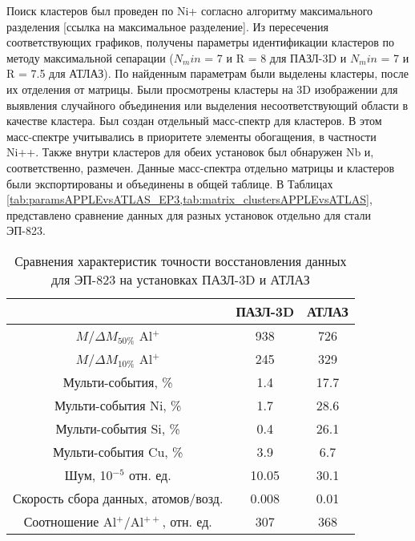 Поиск кластеров был проведен по Ni+ согласно алгоритму максимального разделения [ссылка на максимальное разделение]. Из пересечения соответствующих графиков, получены параметры идентификации кластеров по методу максимальной сепарации ($N_min$ = 7 и R = 8 для ПАЗЛ-3D и $N_min$ = 7 и R = 7.5 для АТЛАЗ). По найденным параметрам были выделены кластеры, после их отделения от матрицы. Были просмотрены кластеры на 3D изображении для выявления случайного объединения или выделения несоответствующий области в качестве кластера. Был создан отдельный масс-спектр для кластеров. В этом масс-спектре учитывались в приоритете элементы обогащения, в частности Ni++. Также внутри кластеров для обеих установок был обнаружен Nb и, соответственно, размечен. Данные масс-спектра отдельно матрицы и кластеров были экспортированы и объединены в общей таблице. В Таблицах \cref{tab:paramsAPPLEvsATLAS_EP3,tab:matrix_clustersAPPLEvsATLAS}, представлено сравнение данных для разных установок отдельно для стали ЭП-823.

\begin{table} [htbp]
	\centering
	\caption{Сравнения характеристик точности восстановления данных для ЭП-823 на установках ПАЗЛ-3D и АТЛАЗ}
	\label{tab:paramsAPPLEvsATLAS_EP3}
	\begin{SingleSpace}
		\begin{tabular} {| c | c | c |}
			\hline
			{}                                     & ПАЗЛ-3D & АТЛАЗ   \\ \hline
			$M/\Delta M_{50\%}$ Al$^+$             & 938     & 726     \\ \hline
			$M/\Delta M_{10\%}$ Al$^+$             & 245     & 329     \\ \hline
			Мульти-события, \%                     & 1.4     & 17.7                 \\ \hline
			Мульти-события Ni, \%                  & 1.7     & 28.6             \\ \hline
			Мульти-события Si, \%                  & 0.4     & 26.1             \\ \hline
			Мульти-события Cu, \%                  & 3.9     & 6.7             \\ \hline
			Шум, 10$^{-5}$ отн. ед.                & 10.05   & 30.1     \\ \hline
			Скорость сбора данных, атомов/возд.    & 0.008   & 0.01  \\ \hline
			Соотношение Al$^+$/Al$^{++}$, отн. ед. & 307     & 368     \\ \hline
		\end{tabular}
	\end{SingleSpace}
\end{table}

